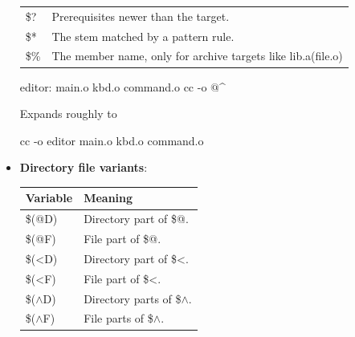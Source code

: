 \documentclass{report}
\begin{document}
\begin{itemize}
\begin{center}
\begin{tabularx}{\textwidth}{@{}lX@{}}
                    \$?	&Prerequisites newer than the target.\\[2ex]
                    \$*	&The stem matched by a pattern rule.\\[2ex]
                    \$\%	&The member name, only for archive targets like lib.a(file.o) \\
                    \bottomrule
                \end{tabularx}
            \end{center}
            \bigbreak \noindent 
            \begin{bashcode}
                editor: main.o kbd.o command.o
                    cc -o $@ $^
            \end{bashcode}
            \bigbreak \noindent 
            Expands roughly to 
            \bigbreak \noindent 
            \begin{bashcode}
            cc -o editor main.o kbd.o command.o
            \end{bashcode}
        \item \textbf{Directory file variants}: 
            \begin{center}
                \begin{tabularx}{\textwidth}{@{}lX@{}}
                    \toprule 
                    \textbf{Variable}&	\textbf{Meaning} \\
                    \midrule
                    \$(@D)	&Directory part of \$@.\\[2ex]
                    \$(@F)	&File part of \$@.\\[2ex]
                    \$(<D)	&Directory part of \$<.\\[2ex]
                    \$(<F)	&File part of \$<.\\[2ex]
                    \$($\land$D)	&Directory parts of \$$\land$.\\[2ex]
                    \$($\land$F)	&File parts of \$$\land$. \\
                    \bottomrule
                \end{tabularx}
            \end{center}




    \end{itemize}
\end{document}
